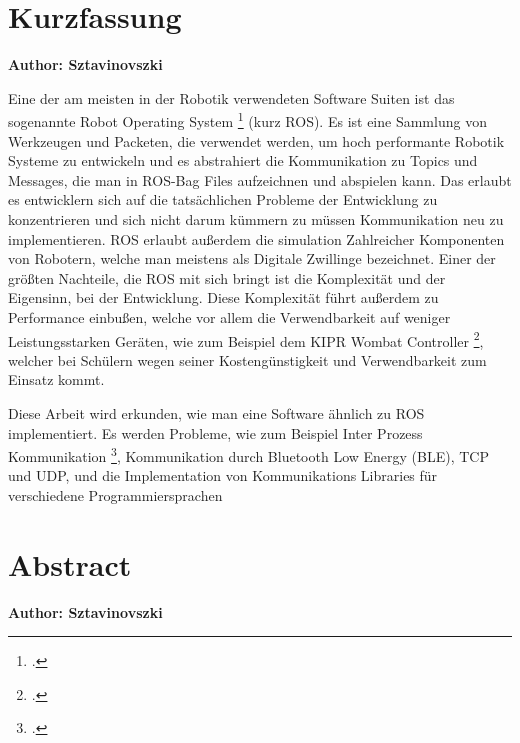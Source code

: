 \chapter{Kurzfassung}

\textbf{Author: Sztavinovszki}

\vspace{10mm}

Eine der am meisten in der Robotik verwendeten Software Suiten ist das sogenannte Robot Operating System \footcite{ros-site} (kurz ROS).
Es ist eine Sammlung von Werkzeugen und Packeten, die verwendet werden, um hoch performante Robotik Systeme zu entwickeln und es abstrahiert
die Kommunikation zu Topics und Messages, die man in ROS-Bag Files aufzeichnen und abspielen kann. Das erlaubt es entwicklern sich auf die tatsächlichen Probleme der Entwicklung zu konzentrieren und sich nicht darum kümmern zu müssen Kommunikation neu zu implementieren.
ROS erlaubt außerdem die simulation Zahlreicher Komponenten von Robotern, welche man meistens als Digitale Zwillinge bezeichnet.
Einer der größten Nachteile, die ROS mit sich bringt ist die Komplexität und der Eigensinn, bei der Entwicklung. Diese Komplexität führt außerdem zu Performance einbußen, welche vor allem die Verwendbarkeit auf weniger Leistungsstarken Geräten, wie zum Beispiel dem KIPR Wombat Controller \footcite{wombat-controller}, welcher bei Schülern wegen seiner Kostengünstigkeit und Verwendbarkeit zum Einsatz kommt.

\medskip

Diese Arbeit wird erkunden, wie man eine Software ähnlich zu ROS implementiert. Es werden Probleme, wie zum Beispiel Inter Prozess Kommunikation \footcite{ipc-begriff}, Kommunikation durch Bluetooth Low Energy (BLE), TCP und UDP, und die Implementation von Kommunikations Libraries für verschiedene Programmiersprachen


\chapter{Abstract}

\textbf{Author: Sztavinovszki}

\vspace{10mm}





